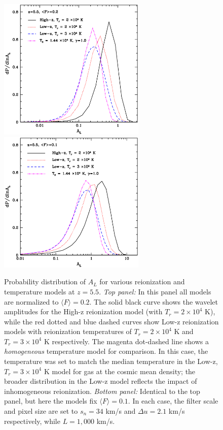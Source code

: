 \begin{figure}
\bc
\includegraphics[width=7cm]{f14a.eps}
\includegraphics[width=7cm]{f14b.eps}
\caption{Probability distribution of $A_L$ for various reionization and temperature models at $z=5.5$. {\it Top panel:} In this panel all models are normalized to $\langle F \rangle =0.2$. The solid black curve shows the wavelet amplitudes for the High-z reionization model (with $T_r = 2 \times 10^4$ K), while the red dotted and blue dashed curves show Low-z reionization models with reionization temperatures of $T_r = 2 \times 10^4$ K and $T_r = 3 \times 10^4$ K respectively. The magenta dot-dashed line shows a {\em homogeneous} temperature model for comparison. In this case, the temperature was set to match the median temperature in the Low-z, $T_r = 3 \times 10^4$ K model for gas at the cosmic mean density; the broader distribution in the Low-z model reflects the impact of inhomogeneous reionization. {\it Bottom panel:} Identical to the top panel, but here the models fix $\langle F \rangle =0.1$. In each case, the filter scale and pixel size are set to $s_n=34$ km/s and $\Delta u=2.1$ km/s respectively, while $L=1,000$ km/s.}
\label{fig:pdf_al_inhomog}
\ec
\end{figure}


